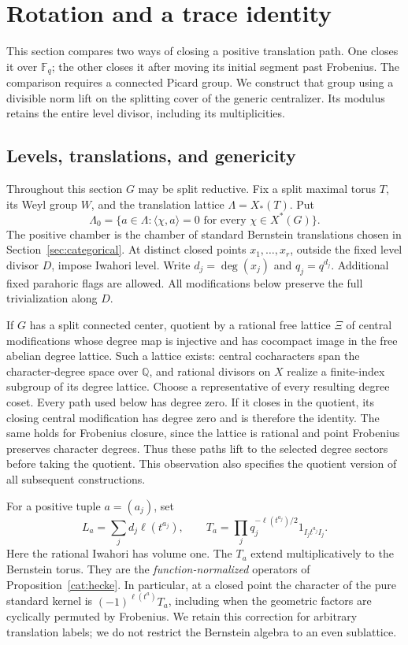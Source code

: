 \section{Rotation and a trace identity}\label{sec:rotation}

This section compares two ways of closing a positive translation path.
One closes it over $\mathbb F_q$; the other closes it after moving its
initial segment past Frobenius.  The comparison requires a connected
Picard group.  We construct that group using a divisible norm lift on the
splitting cover of the generic centralizer.  Its modulus retains the
entire level divisor, including its multiplicities.

\subsection{Levels, translations, and genericity}

Throughout this section $G$ may be split reductive.  Fix a split maximal
torus $T$, its Weyl group $W$, and the translation lattice
$\Lambda=X_*(T)$.  Put
\[
 \Lambda_0=\{a\in\Lambda:\langle\chi,a\rangle=0
                         \text{ for every }\chi\in X^*(G)\}.
\]
The positive chamber is the chamber of standard Bernstein translations
chosen in Section~\ref{sec:categorical}.  At distinct closed points
$x_1,\ldots,x_r$, outside the fixed level divisor $D$, impose Iwahori
level.  Write $d_j=\deg(x_j)$ and $q_j=q^{d_j}$.  Additional fixed
parahoric flags are allowed.  All modifications below preserve the full
trivialization along $D$.

If $G$ has a split connected center, quotient by a rational free lattice
$\Xi$ of central modifications whose degree map is injective and has
cocompact image in the free abelian degree lattice.  Such a lattice exists:
central cocharacters span the character-degree space over $\mathbb Q$,
and rational divisors on $X$ realize a finite-index subgroup of its degree
lattice.  Choose a representative of every resulting degree coset.
Every path used below has degree zero.  If it closes in the quotient,
its closing central modification has degree zero and is therefore the
identity.  The same holds for Frobenius closure, since the lattice is
rational and point Frobenius preserves character degrees.  Thus these
paths lift to the selected degree sectors before taking the quotient.
This observation also specifies the quotient version of all subsequent
constructions.

For a positive tuple $a=(a_j)$, set
\[
 L_a=\sum_j d_j\ell(t^{a_j}),\qquad
 T_a=\prod_j q_j^{-\ell(t^{a_j})/2}
                    1_{I_jt^{a_j}I_j}.
\]
Here the rational Iwahori has volume one.  The $T_a$ extend
multiplicatively to the Bernstein torus.  They are the
\emph{function-normalized} operators of Proposition~\ref{cat:hecke}.
In particular, at a closed point the character of the pure standard
kernel is $(-1)^{\ell(t^a)}T_a$, including when the geometric factors
are cyclically permuted by Frobenius.  We retain this correction for
arbitrary translation labels; we do not restrict the Bernstein algebra
to an even sublattice.

